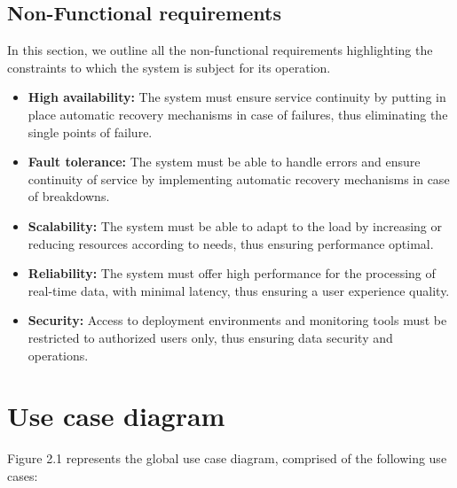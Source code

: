 \subsection{Non-Functional requirements}

In this section, we outline all the non-functional requirements highlighting the constraints to which the system is subject for its operation.

\begin{itemize}
    \item \textbf{High availability:} The system must ensure service continuity by putting
    in place automatic recovery mechanisms in case of failures, thus eliminating
    the single points of failure.
    \item \textbf{Fault tolerance:} The system must be able to handle errors and ensure
    continuity of service by implementing automatic recovery mechanisms
    in case of breakdowns.
    \item \textbf{Scalability:} The system must be able to adapt to the load by increasing
    or reducing resources according to needs, thus ensuring performance
    optimal.
    \item \textbf{Reliability:} The system must offer high performance for the processing of
    real-time data, with minimal latency, thus ensuring a user experience
    quality.
    \item \textbf{Security:} Access to deployment environments and monitoring tools
    must be restricted to authorized users only, thus ensuring data security
    and operations.
\end{itemize}

\section{Use case diagram}

Figure 2.1 represents the global use case diagram, comprised of the following use cases:

